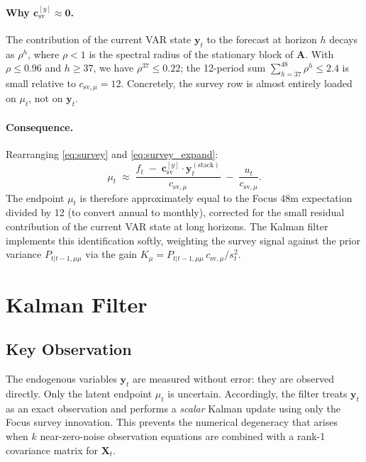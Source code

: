 \documentclass[12pt, a4paper]{article}
\newcommand{\bs}[1]{\boldsymbol{#1}}
\begin{document}
\paragraph{Why $\bs{c}_{\mathrm{sv}}^{[y]}\approx \bs{0}$.}
The contribution of the current VAR state $\bs{y}_t$ to the forecast at
horizon $h$ decays as $\rho^h$, where $\rho < 1$ is the spectral radius of
the stationary block of $\bs{A}$. With $\rho \leq 0.96$ and $h \geq 37$,
we have $\rho^{37} \leq 0.22$; the 12-period sum
$\sum_{h=37}^{48}\rho^h \leq 2.4$ is small relative to $c_{\mathrm{sv},\mu}=12$.
Concretely, the survey row is almost entirely loaded on $\mu_t$, not on
$\bs{y}_t$.

\paragraph{Consequence.}
Rearranging \eqref{eq:survey} and \eqref{eq:survey_expand}:
\begin{equation}
    \mu_t \;\approx\;
    \frac{f_t \;-\; \bs{c}_{\mathrm{sv}}^{[y]}\cdot\bs{y}_t^{(\mathrm{stack})}}{c_{\mathrm{sv},\mu}}
    \;-\; \frac{u_t}{c_{\mathrm{sv},\mu}}.
    \label{eq:mu_from_focus}
\end{equation}
The endpoint $\mu_t$ is therefore approximately equal to the Focus
48m expectation divided by 12 (to convert annual to monthly), corrected
for the small residual contribution of the current VAR state at long
horizons. The Kalman filter implements this identification softly,
weighting the survey signal against the prior variance
$P_{t|t-1,\mu\mu}$ via the gain
$K_\mu = P_{t|t-1,\mu\mu}\,c_{\mathrm{sv},\mu} / s^2_t$.

\section{Kalman Filter}
\label{sec:kalman}

\subsection{Key Observation}

The endogenous variables $\bs{y}_t$ are measured without error: they are
observed directly. Only the latent endpoint $\mu_t$ is uncertain.
Accordingly, the filter treats $\bs{y}_t$ as an exact observation and
performs a \emph{scalar} Kalman update using only the Focus survey
innovation. This prevents the numerical degeneracy that arises when $k$
near-zero-noise observation equations are combined with a rank-1 covariance
matrix for $\bs{X}_t$.
\end{document}
